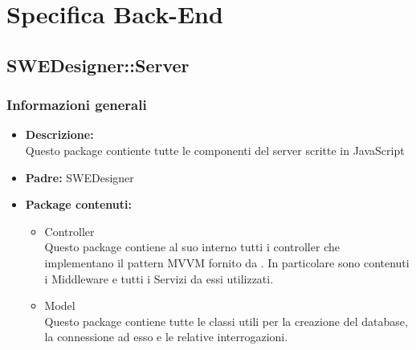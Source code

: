 \section{Specifica Back-End}
  \subsection{SWEDesigner::Server}
    \subsubsection{Informazioni generali}
      \begin{itemize}
        \item \textbf{Descrizione:}\\
        Questo package contiente tutte le componenti del server scritte in JavaScript
        \item \textbf{Padre: } SWEDesigner
        \item \textbf{Package contenuti:}\\
        \begin{itemize}
          \item Controller \\
          Questo package contiene al suo interno tutti i controller che implementano il pattern MVVM fornito da .
          In particolare sono contenuti i Middleware e tutti i Servizi da essi utilizzati.
          \item Model \\
          Questo package contiene tutte le classi utili per la creazione del database, la connessione ad esso e le relative interrogazioni.
        \end{itemize}
      \end{itemize}
